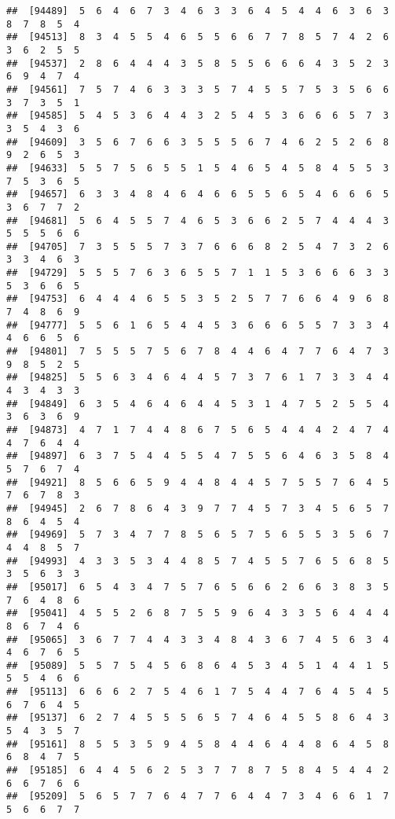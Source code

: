 \documentclass[
]{book}
\begin{document}
\begin{verbatim}
##  [94489]  5  6  4  6  7  3  4  6  3  3  6  4  5  4  4  6  3  6  3  8  7  8  5  4
##  [94513]  8  3  4  5  5  4  6  5  5  6  6  7  7  8  5  7  4  2  6  3  6  2  5  5
##  [94537]  2  8  6  4  4  4  3  5  8  5  5  6  6  6  4  3  5  2  3  6  9  4  7  4
##  [94561]  7  5  7  4  6  3  3  3  5  7  4  5  5  7  5  3  5  6  6  3  7  3  5  1
##  [94585]  5  4  5  3  6  4  4  3  2  5  4  5  3  6  6  6  5  7  3  3  5  4  3  6
##  [94609]  3  5  6  7  6  6  3  5  5  5  6  7  4  6  2  5  2  6  8  9  2  6  5  3
##  [94633]  5  5  7  5  6  5  5  1  5  4  6  5  4  5  8  4  5  5  3  7  5  3  6  5
##  [94657]  6  3  3  4  8  4  6  4  6  6  5  5  6  5  4  6  6  6  5  3  6  7  7  2
##  [94681]  5  6  4  5  5  7  4  6  5  3  6  6  2  5  7  4  4  4  3  5  5  5  6  6
##  [94705]  7  3  5  5  5  7  3  7  6  6  6  8  2  5  4  7  3  2  6  3  3  4  6  3
##  [94729]  5  5  5  7  6  3  6  5  5  7  1  1  5  3  6  6  6  3  3  5  3  6  6  5
##  [94753]  6  4  4  4  6  5  5  3  5  2  5  7  7  6  6  4  9  6  8  7  4  8  6  9
##  [94777]  5  5  6  1  6  5  4  4  5  3  6  6  6  5  5  7  3  3  4  4  6  6  5  6
##  [94801]  7  5  5  5  7  5  6  7  8  4  4  6  4  7  7  6  4  7  3  9  8  5  2  5
##  [94825]  5  5  6  3  4  6  4  4  5  7  3  7  6  1  7  3  3  4  4  4  3  4  3  3
##  [94849]  6  3  5  4  6  4  6  4  4  5  3  1  4  7  5  2  5  5  4  3  6  3  6  9
##  [94873]  4  7  1  7  4  4  8  6  7  5  6  5  4  4  4  2  4  7  4  4  7  6  4  4
##  [94897]  6  3  7  5  4  4  5  5  4  7  5  5  6  4  6  3  5  8  4  5  7  6  7  4
##  [94921]  8  5  6  6  5  9  4  4  8  4  4  5  7  5  5  7  6  4  5  7  6  7  8  3
##  [94945]  2  6  7  8  6  4  3  9  7  7  4  5  7  3  4  5  6  5  7  8  6  4  5  4
##  [94969]  5  7  3  4  7  7  8  5  6  5  7  5  6  5  5  3  5  6  7  4  4  8  5  7
##  [94993]  4  3  3  5  3  4  4  8  5  7  4  5  5  7  6  5  6  8  5  3  5  6  3  3
##  [95017]  6  5  4  3  4  7  5  7  6  5  6  6  2  6  6  3  8  3  5  7  6  4  8  6
##  [95041]  4  5  5  2  6  8  7  5  5  9  6  4  3  3  5  6  4  4  4  8  6  7  4  6
##  [95065]  3  6  7  7  4  4  3  3  4  8  4  3  6  7  4  5  6  3  4  4  6  7  6  5
##  [95089]  5  5  7  5  4  5  6  8  6  4  5  3  4  5  1  4  4  1  5  5  5  4  6  6
##  [95113]  6  6  6  2  7  5  4  6  1  7  5  4  4  7  6  4  5  4  5  6  7  6  4  5
##  [95137]  6  2  7  4  5  5  5  6  5  7  4  6  4  5  5  8  6  4  3  5  4  3  5  7
##  [95161]  8  5  5  3  5  9  4  5  8  4  4  6  4  4  8  6  4  5  8  6  8  4  7  5
##  [95185]  6  4  4  5  6  2  5  3  7  7  8  7  5  8  4  5  4  4  2  6  6  7  6  6
##  [95209]  5  6  5  7  7  6  4  7  7  6  4  4  7  3  4  6  6  1  7  5  6  6  7  7

\end{verbatim}
\end{document}
